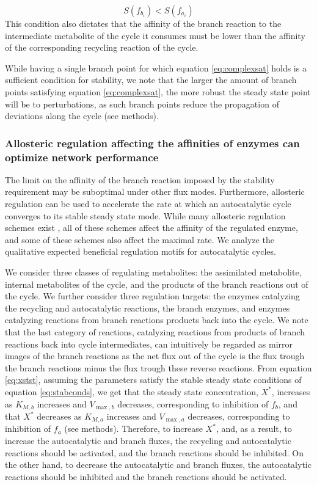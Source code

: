     \begin{equation}
        S(f_{b_i}) < S(f_{a_i})
      \label{eq:complexsat}
    \end{equation}
    This condition also dictates that the affinity of the branch reaction to the intermediate metabolite of the cycle it consumes must be lower than the affinity of the corresponding recycling reaction of the cycle.

    While having a single branch point for which equation \ref{eq:complexsat} holds is a sufficient condition for stability, we note that the larger the amount of branch points satisfying equation \ref{eq:complexsat}, the more robust the steady state point will be to perturbations, as such branch points reduce the propagation of deviations along the cycle (see methods).

    \subsubsection{Allosteric regulation affecting the affinities of enzymes can optimize network performance}
    The limit on the affinity of the branch reaction imposed by the stability requirement may be suboptimal under other flux modes.
    Furthermore, allosteric regulation can be used to accelerate the rate at which an autocatalytic cycle converges to its stable steady state mode.
    While many allosteric regulation schemes exist \cite{Leskovac2003-li}, all of these schemes affect the affinity of the regulated enzyme, and some of these schemes also affect the maximal rate.
    We analyze the qualitative expected beneficial regulation motifs for autocatalytic cycles.

    We consider three classes of regulating metabolites: the assimilated metabolite, internal metabolites of the cycle, and the products of the branch reactions out of the cycle.
    We further consider three regulation targets: the enzymes catalyzing the recycling and autocatalytic reactions, the branch enzymes, and enzymes catalyzing reactions from branch reactions products back into the cycle.
    We note that the last category of reactions, catalyzing reactions from products of branch reactions back into cycle intermediates, can intuitively be regarded as mirror images of the branch reactions as the net flux out of the cycle is the flux trough the branch reactions minus the flux trough these reverse reactions.
    From equation \ref{eq:xstst}, assuming the parameters satisfy the stable steady state conditions of equation \ref{eq:stabconds}, we get that the steady state concentration, $X^*$, increases as $K_{M,b}$ increases and $V_{\max,b}$ decreases, corresponding to inhibition of $f_b$, and that $X^*$ decreases as $K_{M,a}$ increases and $V_{\max,a}$ decreases, corresponding to inhibition of $f_a$ (see methods).
    Therefore, to increase $X^*$, and, as a result, to increase the autocatalytic and branch fluxes, the recycling and autocatalytic reactions should be activated, and the branch reactions should be inhibited.
    On the other hand, to decrease the autocatalytic and branch fluxes, the autocatalytic reactions should be inhibited and the branch reactions should be activated.

